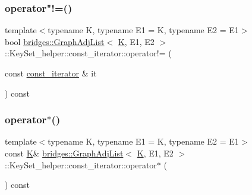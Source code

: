 \subsubsection{\texorpdfstring{operator"!=()}{operator!=()}}
{\footnotesize\ttfamily template$<$typename K, typename E1 = K, typename E2 = E1$>$ \\
bool \hyperlink{classbridges_1_1_graph_adj_list}{bridges\+::\+Graph\+Adj\+List}$<$ \hyperlink{namespacebridges_acfb0a4f7877d8f63de3e6862004c50edaa5f3c6a11b03839d46af9fb43c97c188}{K}, E1, E2 $>$\+::Key\+Set\+\_\+helper\+::const\+\_\+iterator\+::operator!= (\begin{DoxyParamCaption}\item[{const \hyperlink{classbridges_1_1_graph_adj_list_1_1_key_set__helper_1_1const__iterator}{const\+\_\+iterator} \&}]{it }\end{DoxyParamCaption}) const\hspace{0.3cm}{\ttfamily [inline]}}

\mbox{\label{classbridges_1_1_graph_adj_list_1_1_key_set__helper_1_1const__iterator_a0dba71147b10315e669ed929de0be62d}} 
\subsubsection{\texorpdfstring{operator$\ast$()}{operator*()}}
{\footnotesize\ttfamily template$<$typename K, typename E1 = K, typename E2 = E1$>$ \\
const \hyperlink{namespacebridges_acfb0a4f7877d8f63de3e6862004c50edaa5f3c6a11b03839d46af9fb43c97c188}{K}\& \hyperlink{classbridges_1_1_graph_adj_list}{bridges\+::\+Graph\+Adj\+List}$<$ \hyperlink{namespacebridges_acfb0a4f7877d8f63de3e6862004c50edaa5f3c6a11b03839d46af9fb43c97c188}{K}, E1, E2 $>$\+::Key\+Set\+\_\+helper\+::const\+\_\+iterator\+::operator$\ast$ (\begin{DoxyParamCaption}{ }\end{DoxyParamCaption}) const\hspace{0.3cm}{\ttfamily [inline]}}

